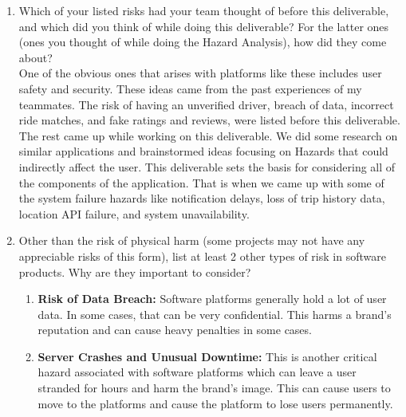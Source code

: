 \documentclass{article}
\begin{document}
\begin{enumerate}
    \item Which of your listed risks had your team thought of before this
    deliverable, and which did you think of while doing this deliverable? For
    the latter ones (ones you thought of while doing the Hazard Analysis), how
    did they come about?\\
   One of the obvious ones that arises with platforms like these includes user safety and security. These ideas came from the past experiences of my teammates. The risk of having an unverified driver, breach of data, incorrect ride matches, and fake ratings and reviews, were listed before this deliverable. The rest came up while working on this deliverable. We did some research on similar applications and brainstormed ideas focusing on Hazards that could indirectly affect the user. This deliverable sets the basis for considering all of the components of the application. That is when we came up with some of the system failure hazards like notification delays, loss of trip history data, location API failure, and system unavailability. 

    \item Other than the risk of physical harm (some projects may not have any
    appreciable risks of this form), list at least 2 other types of risk in
    software products. Why are they important to consider?\\
    \begin{enumerate}
    \item \textbf{Risk of Data Breach:} Software platforms generally hold a lot of user data. In some cases, that can be very confidential. This harms a brand's reputation and can cause heavy penalties in some cases.  
    \item \textbf{Server Crashes and Unusual Downtime:} This is another critical hazard associated with software platforms which can leave a user stranded for hours and harm the brand's image. This can cause users to move to the platforms and cause the platform to lose users permanently.  
\end{enumerate}



\end{enumerate}
\end{document}
